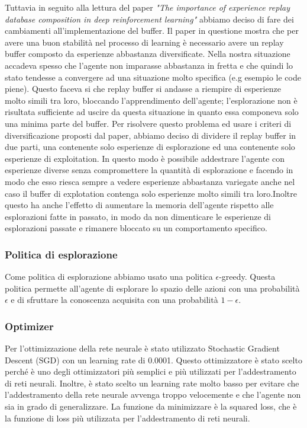 \documentclass[conference]{IEEEtran}
\begin{document}
Tuttavia in seguito alla lettura del paper \textit{"The importance of experience replay database composition in deep reinforcement learning"}\cite{b1} abbiamo deciso di fare dei cambiamenti all'implementazione del buffer. Il paper in questione mostra che per avere una buon stabilità nel processo di learning è necessario avere un replay buffer composto da esperienze abbastanza diversificate. Nella nostra situazione accadeva spesso che l'agente non imparasse abbastanza in fretta e che quindi lo stato tendesse a convergere ad una situazione molto specifica (e.g esempio le code piene). Questo faceva si che replay buffer si andasse a riempire di esperienze molto simili tra loro, bloccando l'apprendimento dell'agente; l'esplorazione non è risultata sufficiente ad uscire da questa situazione in quanto essa componeva solo una minima parte del buffer. Per risolvere questo problema ed usare i criteri di diversificazione proposti dal paper, abbiamo deciso di dividere il replay buffer in due parti, una contenente solo esperienze di esplorazione ed una contenente solo esperienze di exploitation. In questo modo è possibile addestrare l'agente con esperienze diverse senza compromettere la quantità di esplorazione e facendo in modo che esso riesca sempre a vedere esperienze abbastanza variegate anche nel caso il buffer di explotation contenga solo esperienze molto simili tra loro.Inoltre questo ha anche l'effetto di aumentare la memoria dell'agente rispetto alle esplorazioni fatte in passato, in modo da non dimenticare le esperienze di esplorazioni passate e rimanere bloccato su un comportamento specifico.

\subsubsection{Politica di esplorazione}
Come politica di esplorazione abbiamo usato una politica $\epsilon$-greedy. Questa politica permette all'agente di esplorare lo spazio delle azioni con una probabilità $\epsilon$ e di sfruttare la conoscenza acquisita con una probabilità $1 - \epsilon$. 

\subsubsection{Optimizer}
Per l'ottimizzazione della rete neurale è stato utilizzato Stochastic Gradient Descent (SGD) con un learning rate di 0.0001. Questo ottimizzatore è stato scelto perché è uno degli ottimizzatori più semplici e più utilizzati per l'addestramento di reti neurali. Inoltre, è stato scelto un learning rate molto basso per evitare che l'addestramento della rete neurale avvenga troppo velocemente e che l'agente non sia in grado di generalizzare. La funzione da minimizzare è la squared loss, che è la funzione di loss più utilizzata per l'addestramento di reti neurali.
\end{document}
